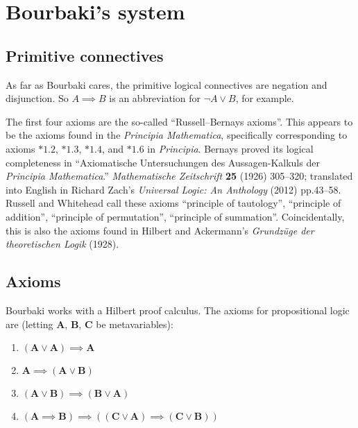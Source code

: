 \documentclass{amsart}%
\newcommand\metavariable[1]{\boldsymbol{#1}}
\begin{document}
\section{Bourbaki's system}

\subsection{Primitive connectives}
As far as Bourbaki cares, the primitive logical connectives are negation
and disjunction. So $A\implies B$ is an abbreviation for $\neg A\lor B$,
for example.

\begin{remark}
The first four axioms are the so-called ``Russell--Bernays axioms''.
This appears to be the axioms found in the
\textit{Principia Mathematica}, specifically corresponding to axioms
$*1.2$, $*1.3$, $*1.4$, and $*1.6$ in \textit{Principia}. Bernays proved
its logical completeness in ``Axiomatische Untersuchungen des
Aussagen-Kalkuls der \textit{Principia Mathematica}.''
\textit{Mathematische Zeitschrift} \textbf{25} (1926) 305--320;
translated into English in Richard Zach's \textit{Universal Logic: An
  Anthology} (2012) pp.43--58. Russell and Whitehead call these axioms
``principle of tautology'', ``principle of addition'',
``principle of permutation'', ``principle of
summation''. Coincidentally, this is also the axioms found in Hilbert
and Ackermann's \textit{Grundz\"{u}ge der theoretischen Logik} (1928).
\end{remark}

\subsection{Axioms}
Bourbaki works with a Hilbert proof calculus. The axioms for
propositional logic are (letting $\metavariable{A}$, $\metavariable{B}$, $\metavariable{C}$ be metavariables):
\begin{enumerate}[label=(S\arabic*),ref={S\arabic*}]
\item\label{axiom:s1} $(\metavariable{A}\lor\metavariable{A})\implies\metavariable{A}$
\item\label{axiom:s2} $\metavariable{A}\implies(\metavariable{A}\lor\metavariable{B})$
\item\label{axiom:s3} $(\metavariable{A}\lor\metavariable{B})\implies(\metavariable{B}\lor\metavariable{A})$
\item\label{axiom:s4} $(\metavariable{A}\implies\metavariable{B})\implies((\metavariable{C}\lor\metavariable{A})\implies(\metavariable{C}\lor\metavariable{B}))$
\end{enumerate}
\end{document}
